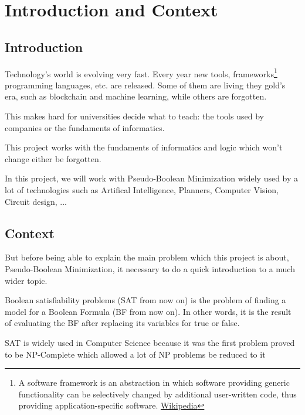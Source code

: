 \chapter{Introduction and Context}
\label{Chapter1}

\section{Introduction}
Technology's world is evolving very fast. Every year new tools, frameworks\footnote{A software framework is an abstraction in which software providing generic functionality can be selectively changed by additional user-written code, thus providing application-specific software. \href{https://en.wikipedia.org/wiki/Software_framework}{Wikipedia}} programming languages, etc. are released. Some of them are living they gold's era, such as blockchain and machine learning,  while others are forgotten.  

This makes hard for universities decide what to teach: the tools used by companies or the fundaments of informatics.  

This project works with the fundaments of informatics and logic which won't change either be forgotten.  


In this project, we will work with Pseudo-Boolean Minimization widely used by a lot of technologies such as Artifical Intelligence, Planners, Computer Vision,  Circuit design, ... 


\section{Context} 


But before being able to explain the main problem which this project is about, Pseudo-Boolean Minimization, it necessary to do a quick introduction to a much wider topic. 


Boolean satisfiability problems (SAT from now on) is the problem of finding a model for a Boolean Formula (BF from now on). In other words, it is the result of evaluating the BF after replacing its variables for true or false. 

SAT is widely used in Computer Science because it was the first problem proved to be NP-Complete which allowed a lot of NP problems be reduced to it\cite{Cook1971}

